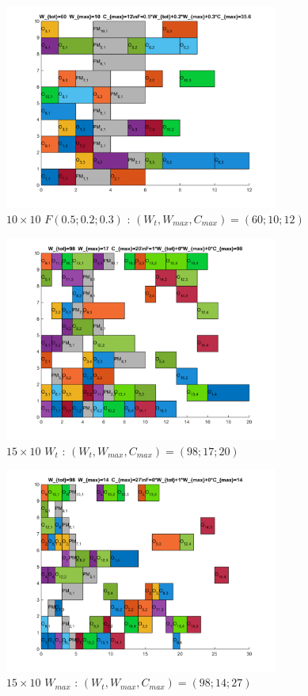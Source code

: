 \documentclass[10pt,a4paper]{scrartcl}
\begin{document}
\begin{figure}
  \centering
  \includegraphics[width=0.8\textwidth]{img/results10x10_F050203.png}
  \caption{$10 \times 10$ $F(0.5;0.2;0.3)$ : $(W_t, W_{max}, C_{max}) = (60; 10; 12)$}
\end{figure}
\begin{figure}
  \centering
  \includegraphics[width=0.8\textwidth]{img/results15x10_Wtot.png}
  \caption{$15 \times 10$ $W_{t}$ : $(W_t, W_{max}, C_{max}) = (98; 17; 20)$}
\end{figure}
\begin{figure}
  \centering
  \includegraphics[width=0.8\textwidth]{img/results15x10_Wmax.png}
  \caption{$15 \times 10$ $W_{max}$ : $(W_t, W_{max}, C_{max}) = (98; 14; 27)$}
\end{figure}
\end{document}
